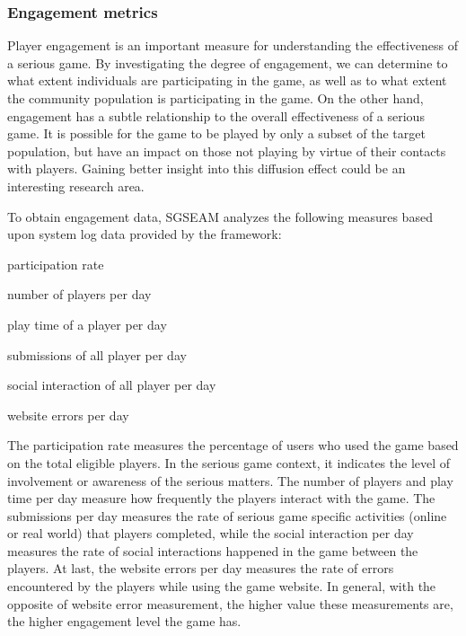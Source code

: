 \subsubsection{Engagement metrics}
\label{Engagement metrics}

Player engagement is an important measure for understanding the effectiveness of a serious game.
By investigating the degree of engagement, we can determine to what extent individuals are
participating in the game, as well as to what extent the community population is participating in
the game. On the other hand, engagement has a subtle relationship to the overall effectiveness of a 
serious game. It is possible for the game to be played by only a subset of the target population, but
have an impact on those not playing by virtue of their contacts with players. Gaining
better insight into this diffusion effect could be an interesting research area. 

To obtain engagement data, SGSEAM analyzes the following measures
based upon system log data provided by the framework:\\
 
\begin{compactitem}
\item participation rate
\item number of players per day
\item play time of a player per day
\item submissions of all player per day
\item social interaction of all player per day
\item website errors per day\\
\end{compactitem}

The participation rate measures the percentage of users who used the game based on the total
eligible players. In the serious game context, it indicates the level of involvement or awareness
of the serious matters. The number of players and play time per day measure how frequently the
players interact with the game. The submissions per day measures the rate of serious game
specific activities (online or real world) that players completed, while the social interaction
per day measures the rate of social interactions happened in the game between the players. At
last, the website errors per day measures the rate of errors encountered by the players while
using the game website. In general, with the opposite of website error measurement, the higher
value these measurements are, the higher engagement level the game has.

